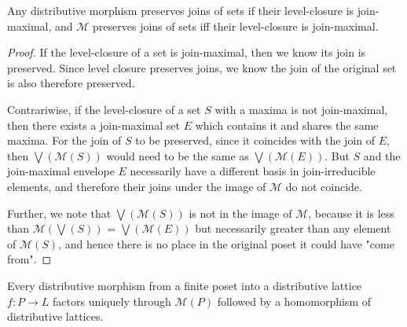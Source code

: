\documentclass[hoptionsi,review,format=sigplan]{acmart}
\theoremstyle{definition}
\newcommand{\Mcc}{\mathcal{M}}
\begin{document}
\begin{lemma}
Any distributive morphism preserves joins of sets if their level-closure is join-maximal, and \(\Mcc\) preserves joins of sets iff their level-closure is join-maximal.
\end{lemma}
\begin{proof}
If the level-closure of a set is join-maximal, then we know its join is preserved. Since level closure preserves joins, we know the join of the original set is also therefore preserved.

Contrariwise, if the level-closure of a set \(S\) with a maxima is not join-maximal, then there exists a join-maximal set \(E\) which contains it and shares the same maxima. For the join of \(S\) to be preserved, since it coincides with the join of \(E\), then \(\bigvee(\Mcc(S))\) would need to be the same as \(\bigvee(\Mcc(E))\). But \(S\) and the join-maximal envelope \(E\) necessarily have a different basis in join-irreducible elements, and therefore their joins under the image of \(\Mcc\) do not coincide.

Further, we note that \(\bigvee(\Mcc(S))\) is not in the image of \(\Mcc\), because it is less than \(\Mcc(\bigvee(S))\) = \(\bigvee(\Mcc(E))\) but necessarily greater than any element of \(\Mcc(S)\), and hence there is no place in the original poset it could have "come from".
\end{proof}




\begin{lemma}
Every distributive morphism from a finite poset into a distributive lattice \(f : P \rightarrow L\) factors uniquely through \(\Mcc(P)\) followed by a homomorphism of distributive lattices.
\end{lemma}
\end{document}
